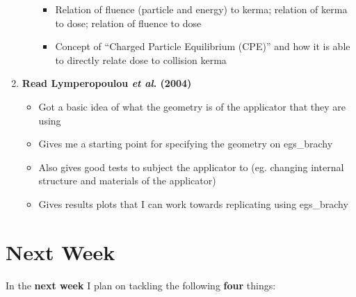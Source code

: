\documentclass[12pt]{article}
\begin{document}
\begin{enumerate}
\begin{itemize}
\begin{itemize}
			\item Relation of fluence (particle and energy) to kerma; relation of kerma to dose; relation of fluence to dose
			\item Concept of ``Charged Particle Equilibrium (CPE)'' and how it is able to directly relate dose to collision kerma
		\end{itemize}
	\end{itemize}
	\item \textbf{Read Lymperopoulou \textit{et al}. (2004)}
	\begin{itemize}
		\item Got a basic idea of what the geometry is of the applicator that they are using 
		\item Gives me a starting point for specifying the geometry on egs\_brachy
		\item Also gives good tests to subject the applicator to (eg. changing internal structure and materials of the applicator)
		\item Gives results plots that I can work towards replicating using egs\_brachy		
	\end{itemize}
\end{enumerate}

\section{Next Week}

In the \textbf{next week} I plan on tackling the following \textbf{four} things:
\end{document}

